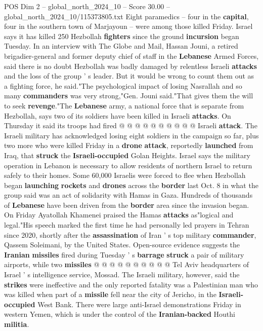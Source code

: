 \begin{textsample}{POS Dim 2 – global\_north\_2024\_10 – Score 30.00 – global\_north\_2024\_10/115373805.txt}
Eight paramedics -- four in the \textbf{capital}, four in the southern town of Marjayoun -- were among those killed Friday.
Israel says it has killed 250 Hezbollah \textbf{fighters} since the ground \textbf{incursion} began Tuesday.
In an interview with The Globe and Mail, Hassan Jouni, a retired brigadier-general and former deputy chief of staff in the \textbf{Lebanese} Armed Forces, said there is no doubt Hezbollah was badly damaged by relentless Israeli \textbf{attacks} and the loss of the group ' s leader.
But it would be wrong to count them out as a fighting force, he said."The psychological impact of losing Nasrallah and so many \textbf{commanders} was very strong,"Gen.
Jouni said."That gives them the will to seek \textbf{revenge}."The \textbf{Lebanese} army, a national force that is separate from Hezbollah, says two of its soldiers have been killed in Israeli \textbf{attacks}.
On Thursday it said its troops had fired @ @ @ @ @ @ @ @ @ @ Israeli \textbf{attack}.
The Israeli military has acknowledged losing eight soldiers in the campaign so far, plus two more who were killed Friday in a \textbf{drone} \textbf{attack}, reportedly \textbf{launched} from Iraq, that \textbf{struck} the \textbf{Israeli-occupied} Golan Heights.
Israel says the military operation in Lebanon is necessary to allow residents of northern Israel to return safely to their homes.
Some 60,000 Israelis were forced to flee when Hezbollah began \textbf{launching} \textbf{rockets} and \textbf{drones} across the \textbf{border} last Oct. 8 in what the group said was an act of solidarity with Hamas in Gaza.
Hundreds of thousands of \textbf{Lebanese} have been driven from the \textbf{border} area since the invasion began.
On Friday Ayatollah Khamenei praised the Hamas \textbf{attacks} as"logical and legal."His speech marked the first time he had personally led prayers in Tehran since 2020, shortly after the \textbf{assassination} of Iran ' s top military \textbf{commander}, Qassem Soleimani, by the United States.
Open-source evidence suggests the \textbf{Iranian} \textbf{missiles} fired during Tuesday ' s \textbf{barrage} \textbf{struck} a pair of military airports, while two \textbf{missiles} @ @ @ @ @ @ @ @ @ @ Tel Aviv headquarters of Israel ' s intelligence service, Mossad.
The Israeli military, however, said the \textbf{strikes} were ineffective and the only reported fatality was a Palestinian man who was killed when part of a \textbf{missile} fell near the city of Jericho, in the \textbf{Israeli-occupied} West Bank.
There were large anti-Israel demonstrations Friday in western Yemen, which is under the control of the \textbf{Iranian-backed} Houthi \textbf{militia}.

\end{textsample}
